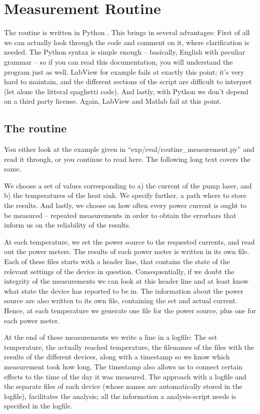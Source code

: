 \section{Measurement Routine}
\label{sec:routine}

The routine is written in Python \cite{Python}.
This brings in several advantages:
First of all we can actually look through the code
and comment on it,
where clarification is needed.
The Python syntax is simple enough --
basically, English with peculiar grammar --
so if you can read this documentation,
you will understand the program just as well.
LabView for example
fails at exactly this point;
it's very hard to maintain,
and the different sections
of the script are difficult to interpret
(let alone the litteral spaghetti code).
And lastly,
with Python we don't depend on a third party license.
Again, LabView and Matlab
fail at this point.

\subsection{The routine}
\label{sec:routine:routine}

You either look at the example
given in ``exp/eval/routine\_measurement.py''
and read it through,
or you continue to read here.
The following long text covers the same.

We choose a set of values corresponding to
a) the current of the pump laser,
and b) the temperatures of the heat sink.
We specify further, a path where to store the results.
And lastly, we choose on how often every power current
is ought to be measured --
repeated measurements in order to obtain
the errorbars
that inform us on the reliability of the results.

At each temperature,
we set the power source to the requested currents,
and read out the power meters.
The results of each power meter is written in its own file.
Each of these files starts with a header line,
that contains the state of the relevant settings of the device in question.
Consequentially,
if we doubt the integrity of the measurements
we can look at this header line and
at least know what state the device has reported to be in.
The information about the power source
are also written to its own file,
containing the set and actual current.
Hence, at each temperature we generate
one file for the power source, plus one for each power meter.

At the end of these measurements we write a line in a logfile:
The set temperature,
the actually reached temperature,
the filenames of the files
with the results of the different devices,
along with a timestamp so we know which measurement took how long.
The timestamp also allows us to connect certain effects
to the time of the day it was measured.
The approach with a logfile
and the separate files of each device
(whose names are automatically stored in the logfile),
facilitates the analysis;
all the information a analysis-script needs is specified in the logfile.

